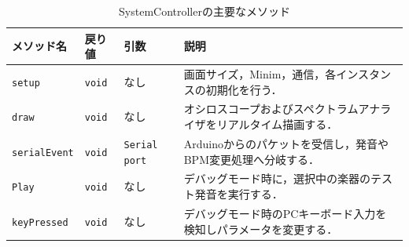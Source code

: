 \documentclass[lualatex,book,paper=a4paper,jafontsize=11.5pt,jafontscale=1.05]{jlreq}
\begin{document}
\begin{table}[H]
    \centering
    \caption{SystemControllerの主要なメソッド}
    \label{table:system_methods}
    \begin{tabular}{llp{2.8cm}p{6.8cm}}
        \hline
        \textbf{メソッド名} & \textbf{戻り値} & \textbf{引数} & \textbf{説明} \\ \hline
        \texttt{setup} & \texttt{void} & なし & 画面サイズ，Minim，通信，各インスタンスの初期化を行う． \\ \hline
        \texttt{draw} & \texttt{void} & なし & オシロスコープおよびスペクトラムアナライザをリアルタイム描画する． \\ \hline
        \texttt{serialEvent} & \texttt{void} & \texttt{Serial port} & Arduinoからのパケットを受信し，発音やBPM変更処理へ分岐する． \\ \hline
        \texttt{Play} & \texttt{void} & なし & デバッグモード時に，選択中の楽器のテスト発音を実行する． \\ \hline
        \texttt{keyPressed} & \texttt{void} & なし & デバッグモード時のPCキーボード入力を検知しパラメータを変更する． \\ \hline
    \end{tabular}
\end{table}
\end{document}
